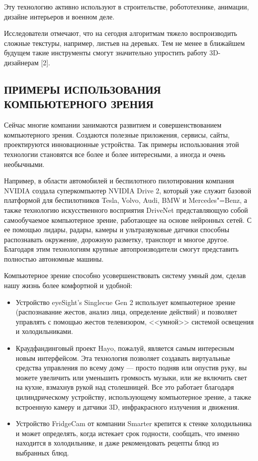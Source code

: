 \documentclass[bachelor, och, referat, times]{SCWorks}
\begin{document}
Эту технологию активно используют в строительстве, робототехнике, анимации, дизайне интерьеров и военном деле. 

Исследователи отмечают, что на сегодня алгоритмам тяжело воспроизводить сложные текстуры, например, листьев на деревьях. Тем не менее в ближайшем будущем такие инструменты смогут значительно упростить работу 3D-дизайнерам [2].

\subsection{ПРИМЕРЫ ИСПОЛЬЗОВАНИЯ КОМПЬЮТЕРНОГО ЗРЕНИЯ}

Сейчас многие компании занимаются развитием и совершенствованием компьютерного зрения. Создаются полезные приложения, сервисы, сайты, проектируются инновационные устройства. Так примеры использования этой технологии становятся все более и более интересными, а иногда и очень необычными.

Например, в области автомобилей и беспилотного пилотирования компания NVIDIA создала суперкомпьютер NVIDIA Drive 2, который уже служит базовой платформой для беспилотников Tesla, Volvo, Audi, BMW и Mercedes"=Benz, а также технологию искусственного восприятия DriveNet представляющую собой самообучаемое компьютерное зрение, работающее на основе нейронных сетей. С ее помощью лидары, радары, камеры и ультразвуковые датчики способны распознавать окружение, дорожную разметку, транспорт и многое другое. Благодаря этим технологиям крупные автопроизводители смогут представить полностью автономные машины.

Компьютерное зрение способно усовершенствовать систему умный дом, сделав нашу жизнь более комфортной и удобной:
\begin {itemize}
\item Устройство eyeSight’s Singlecue Gen 2 использует компьютерное зрение (распознавание жестов, анализ лица, определение действий) и позволяет управлять с помощью жестов телевизором, <<умной>> системой освещения и холодильниками.

\item Краудфандинговый проект Hayo, пожалуй, является самым интересным новым интерфейсом. Эта технология позволяет создавать виртуальные средства управления по всему дому — просто подняв или опустив руку, вы можете увеличить или уменьшить громкость музыки, или же включить свет на кухне, взмахнув рукой над столешницей. Все это работает благодаря цилиндрическому устройству, использующему компьютерное зрение, а также встроенную камеру и датчики 3D, инфракрасного излучения и движения.

\item Устройство FridgeCam от компании Smarter крепится к стенке холодильника и может определять, когда истекает срок годности, сообщать, что именно находится в холодильнике, и даже рекомендовать рецепты блюд из выбранных блюд.
\end{itemize}
\end{document}

